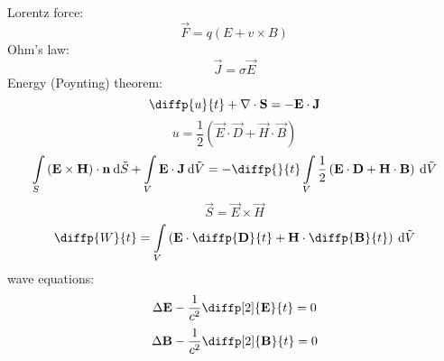 Lorentz force:
\begin{equation}
\vec{F} = q \left(E + v \times B \right) 
\end{equation}
Ohm's law:
\begin{equation}
\vec{J} = \sigma \vec{E}
\end{equation}
Energy (Poynting) theorem:
\begin{equation}
\diffp{u}{t} + \div{\vec{S}} = - \vec{E} \cdot \vec{J}
\end{equation}
\begin{equation}
u = \frac{1}{2} \left(\vec{E} \cdot \vec{D} + \vec{H} \cdot \vec{B} \right)
\end{equation}
\begin{equation}
\int\limits_{S} \left(\vec{E} \times \vec{H} \right) \cdot \vec{n} \: \d \tilde{S} + \int\limits_{V} \vec{E} \cdot \vec{J} \: \d \tilde{V} = - \diffp{}{t} \int\limits_{V} \frac{1}{2} \left(\vec{E} \cdot \vec{D} + \vec{H} \cdot \vec{B} \right) \: \d \tilde{V}
\end{equation}
\begin{equation}
\vec{S} = \vec{E} \times \vec{H}
\end{equation}
\begin{equation}
\diffp{W}{t} = \int\limits_{V} \left(\vec{E} \cdot \diffp{\vec{D}}{t} + \vec{H} \cdot \diffp{\vec{B}}{t}\right) \: \d \tilde{V}
\end{equation}
wave equations:
\begin{equation}
\laplace{\vec{E}} - \frac{1}{c^{2}} \diffp[2]{\vec{E}}{t} = 0
\end{equation}
\begin{equation}
\laplace{\vec{B}} - \frac{1}{c^{2}} \diffp[2]{\vec{B}}{t} = 0
\end{equation}

